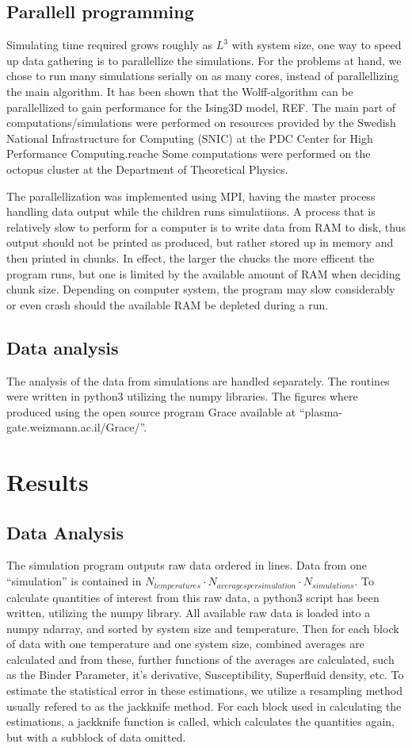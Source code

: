 \documentclass[a4paper]{article}
\begin{document}
\subsection{Parallell programming}
Simulating time required grows roughly as $L^3$ with system size, one way to speed up data gathering is to parallellize the simulations. For the problems at hand, we chose to run many simulations serially on as many cores, instead of parallellizing the main algorithm. It has been shown that the Wolff-algorithm can be parallellized to gain performance for the Ising3D model, REF. 
The main part of computations/simulations were performed on resources provided by the Swedish National Infrastructure for Computing (SNIC) at the PDC Center for High Performance Computing.reache
Some computations were performed on the octopus cluster at the Department of Theoretical Physics.

The parallellization was implemented using MPI, having the master process handling data output while the children runs simulatiions. A process that is relatively slow to perform for a computer is to write data from RAM to disk, thus output should not be printed as produced, but rather stored up in memory and then printed in chunks. In effect, the larger the chucks the more efficent the program runs, but one is limited by the available amount of RAM when deciding chunk size. Depending on computer system, the program may slow considerably or even crash should the available RAM be depleted during a run.
\subsection{Data analysis}
The analysis of the data from simulations are handled separately. The routines were written in python3 utilizing the numpy libraries. 
The figures where produced using the open source program Grace available at ``plasma-gate.weizmann.ac.il/Grace/''.

\section{Results}
\subsection{Data Analysis}
The simulation program outputs raw data ordered in lines. Data from one ``simulation'' is contained in $N_{temperatures} \cdot N_{averages per simulation} \cdot N_{simulations}$.
To calculate quantities of interest from this raw data, a python3 script has been written, utilizing the numpy library. All available raw data is loaded into a numpy ndarray, and sorted by system size and temperature. Then for each block of data with one temperature and one system size, combined averages are calculated and from these, further functions of the averages are calculated, such as the Binder Parameter, it's derivative, Susceptibility, Superfluid density, etc. To estimate the statistical error in these estimations, we utilize a resampling method usually refered to as the jackknife method. For each block used in calculating the estimations, a jackknife function is called, which calculates the quantities again, but with a subblock of data omitted.
\end{document}
